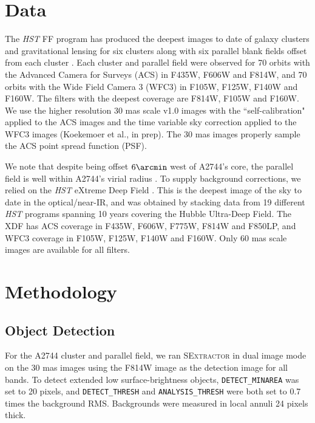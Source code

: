 \documentclass[iop,tighten,twocolumn,apj]{emulateapj}
\begin{document}
\section{Data}

The \textit{HST} FF program has produced the deepest images to date of galaxy clusters
and gravitational lensing for six clusters 
along with six parallel blank fields offset from each cluster
\citep{lotz2016}. Each cluster and parallel field were observed for 70 orbits
with the Advanced Camera for Surveys (ACS) in F435W, F606W and F814W, and 70
orbits with the Wide Field Camera 3 (WFC3) in F105W, F125W, F140W and F160W.
The filters with the deepest coverage are F814W, F105W and F160W. We use the
higher resolution 30 mas scale v1.0 images with the ``self-calibration"
applied to the ACS images and the time variable sky correction applied to the
WFC3 images (Koekemoer et al., in prep). The 30 mas images properly sample the
ACS point spread function (PSF).

We note that despite being offset $6\arcmin$ west of A2744's core, the
parallel field is well within A2744's virial radius \citep[$R_{200} = 9\arcmin
= 2.5~\mathrm{Mpc}$,][]{medezinski2016}.  To supply background corrections, we
relied on the \textit{HST} eXtreme Deep Field \citep[XDF,][]{illingworth2013}.
This is the deepest image of the sky to date in the optical/near-IR, and was
obtained by stacking data from 19 different \textit{HST} programs spanning 10
years covering the Hubble Ultra-Deep Field. The XDF has ACS coverage in F435W,
F606W, F775W, F814W and F850LP, and WFC3 coverage in F105W, F125W, F140W and
F160W.  Only 60 mas scale images are available for all filters.

\section{Methodology}

\subsection{Object Detection}

For the A2744 cluster and parallel field, we ran \textsc{SExtractor} 
\citep{bertin1996} in dual image mode on the 30 mas images using the F814W
image as the detection image for all bands.  To detect extended low
surface-brightness objects, \texttt{DETECT\_MINAREA} was
set to 20 pixels, and \texttt{DETECT\_THRESH} and \texttt{ANALYSIS\_THRESH}
were both set to 0.7 times the background RMS. Backgrounds were measured in
local annuli 24 pixels thick.
\end{document}
